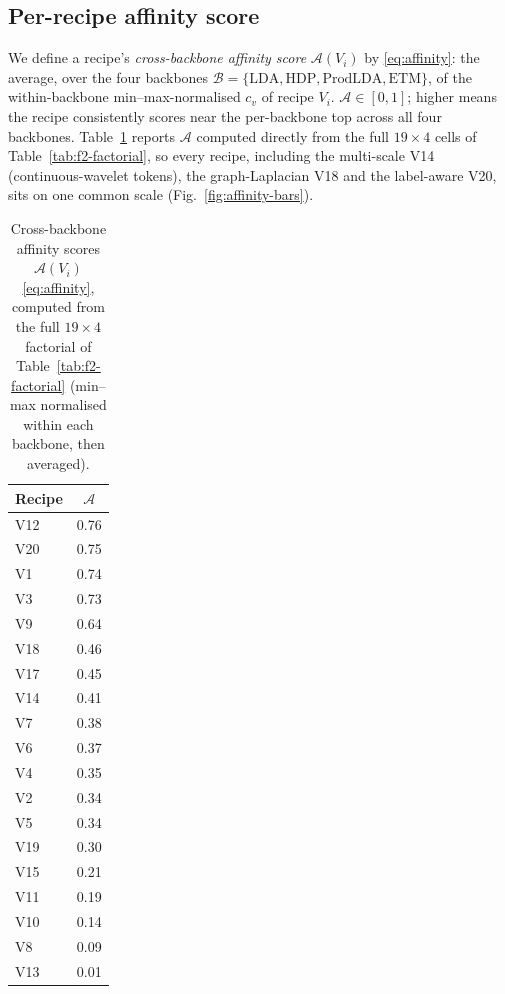 \documentclass[journal,a4paper,10pt]{IEEEtran}
\begin{document}
\subsection{Per-recipe affinity score}

We define a recipe's \emph{cross-backbone affinity score}
$\mathcal{A}(V_i)$ by \eqref{eq:affinity}: the average, over the four
backbones $\mathcal{B} = \{\mathrm{LDA}, \mathrm{HDP}, \mathrm{ProdLDA},
\mathrm{ETM}\}$, of the within-backbone min--max-normalised $c_v$ of
recipe $V_i$. $\mathcal{A} \in [0, 1]$; higher means the recipe
consistently scores near the per-backbone top across all four
backbones. Table~\ref{tab:affinity} reports $\mathcal{A}$ computed
directly from the full $19 \times 4$ cells of
Table~\ref{tab:f2-factorial}, so every recipe, including the
multi-scale V14 (continuous-wavelet tokens), the graph-Laplacian V18
and the label-aware V20, sits on one common scale
(Fig.~\ref{fig:affinity-bars}).

\begin{table}[ht]
\caption{Cross-backbone affinity scores $\mathcal{A}(V_i)$
\eqref{eq:affinity}, computed from the full $19 \times 4$ factorial of
Table~\ref{tab:f2-factorial} (min--max normalised within each backbone,
then averaged).}
\label{tab:affinity}
\centering
\small
\begin{tabular}{lc}
\toprule
Recipe & $\mathcal{A}$ \\
\midrule
V12  & 0.76 \\
V20  & 0.75 \\
V1   & 0.74 \\
V3   & 0.73 \\
V9   & 0.64 \\
V18  & 0.46 \\
V17  & 0.45 \\
V14  & 0.41 \\
V7   & 0.38 \\
V6   & 0.37 \\
V4   & 0.35 \\
V2   & 0.34 \\
V5   & 0.34 \\
V19  & 0.30 \\
V15  & 0.21 \\
V11  & 0.19 \\
V10  & 0.14 \\
V8   & 0.09 \\
V13  & 0.01 \\
\bottomrule
\end{tabular}
\end{table}
\end{document}

